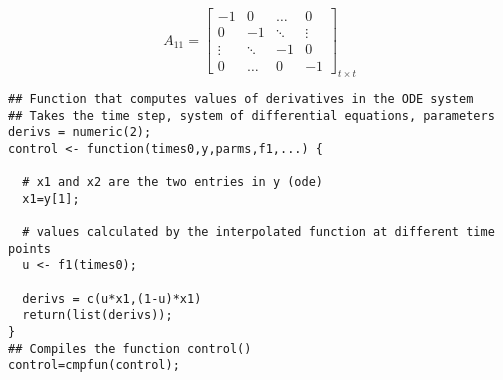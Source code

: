 \documentclass[12pt, oneside]{article}   	%
\begin{document}
\begin{equation}
A_{11}=
  \begin{bmatrix}
    -1		& 0 	 	& \ldots 	& 0  	 \\
    0 	 	& -1  	& \ddots 	& \vdots  \\
    \vdots   & \ddots 	& -1		& 0  \\
    0 		& \ldots 	& 0 		& -1  
  \end{bmatrix}_{ t \times t}
\end{equation}

\begin{lstlisting}
## Function that computes values of derivatives in the ODE system
## Takes the time step, system of differential equations, parameters
derivs = numeric(2); 
control <- function(times0,y,parms,f1,...) {
  
  # x1 and x2 are the two entries in y (ode)
  x1=y[1]; 
  
  # values calculated by the interpolated function at different time points
  u <- f1(times0);
  
  derivs = c(u*x1,(1-u)*x1) 
  return(list(derivs));
}
## Compiles the function control()
control=cmpfun(control); 
\end{lstlisting}

\clearpage
\nocite{*}

 

\end{document}
